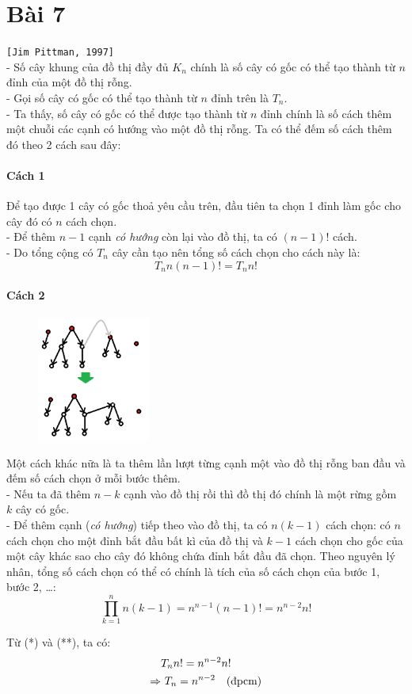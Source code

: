 \documentclass[main.tex]{subfiles}
\begin{document}
\section{Bài 7}
\texttt{[Jim Pittman, 1997]}\\

- Số cây khung của đồ thị đầy đủ $K_n$ chính là số cây có gốc có thể tạo thành từ $n$ đỉnh của một đồ thị rỗng. \\
- Gọi số cây có gốc có thể tạo thành từ $n$ đỉnh trên là $T_n$.\\
- Ta thấy, số cây có gốc có thể được tạo thành từ $n$ đỉnh chính là số cách thêm một chuỗi các cạnh có hướng vào một đồ thị rỗng. Ta có thể đếm số cách thêm đó theo 2 cách sau đây:

\paragraph*{Cách 1}
Để tạo được 1 cây có gốc thoả yêu cầu trên, đầu tiên ta chọn 1 đỉnh làm gốc cho cây đó \Ra có $n$ cách chọn.\\
- Để thêm $n-1$ cạnh \textit{có hướng} còn lại vào đồ thị, ta có $(n-1)!$ cách.\\
- Do tổng cộng có $T_n$ cây cần tạo nên tổng số cách chọn cho cách này là:
\begin{equation}
    T_nn(n-1)!=T_nn! \tag{*}
\end{equation}

\paragraph*{Cách 2}

\begin{figure}
    \includegraphics[width=0.33\textwidth]{image/Bai7.png}
    \vspace*{-1cm}
\end{figure}
Một cách khác nữa là ta thêm lần lượt từng cạnh một vào đồ thị rỗng ban đầu và đếm số cách chọn ở mỗi bước thêm. \\
- Nếu ta đã thêm $n-k$ cạnh vào đồ thị rồi thì đồ thị đó chính là một rừng gồm $k$ cây có gốc.\\
- Để thêm cạnh (\textit{có hướng}) tiếp theo vào đồ thị, ta có $n(k-1)$ cách chọn: có $n$ cách chọn cho một đỉnh bắt đầu bất kì của đồ thị và $k-1$ cách chọn cho gốc của một cây khác sao cho cây đó không chứa đỉnh bắt đầu đã chọn. Theo nguyên lý nhân, tổng số cách chọn có thể có chính là tích của số cách chọn của bước 1, bước 2, \dots:
\begin{equation}
    \prod^{n}_{k=1}n(k-1)=n^{n-1}(n-1)!=n^{n-2}n! \tag{**}
\end{equation}

Từ (*) và (**), ta có:
$$
\begin{aligned}
& T_nn! = n^{n-2}n! \\
\Rightarrow &\ T_n = n^{n-2} \quad \text{(đpcm)}
\end{aligned}
$$
\end{document}
